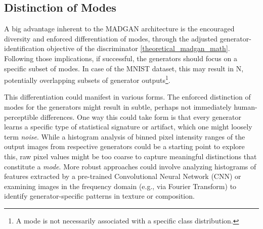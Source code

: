 \subsection{Distinction of Modes}
\noindent A big advantage inherent to the MADGAN architecture is the encouraged diversity and enforced differentiation of modes, through the adjusted generator-identification objective of the discriminator \ref{theoretical_madgan_math}. Following those implications, if successful, the generators should focus on a specific subset of modes. In case of the MNIST dataset, this may result in N, potentially overlapping subsets of generator outputs\footnote{A mode is not necessarily associated with a specific class distribution.}.

This differentiation could manifest in various forms. The enforced distinction of modes for the generators might result in subtle, perhaps not immediately human-perceptible differences. One way this could take form is that every generator learns a specific type of statistical signature or artifact, which one might loosely term \textit{noise}. While a histogram analysis of binned pixel intensity ranges of the output images from respective generators could be a starting point to explore this, raw pixel values might be too coarse to capture meaningful distinctions that constitute a \textit{mode}. More robust approaches could involve analyzing histograms of features extracted by a pre-trained Convolutional Neural Network (CNN) or examining images in the frequency domain (e.g., via Fourier Transform) to identify generator-specific patterns in texture or composition.

